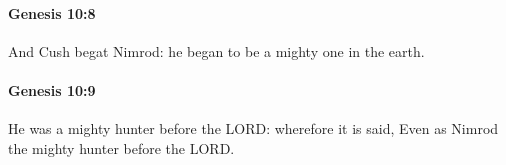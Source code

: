 		\paragraph{Genesis 10:8} %
			\label{GENESIS-10-8}

			And Cush begat Nimrod: he began to be a mighty one in the earth.


		\paragraph{Genesis 10:9} %
			\label{GENESIS-10-9}

			He was a mighty hunter before the LORD: wherefore it is said, Even as Nimrod the mighty hunter before the LORD.


